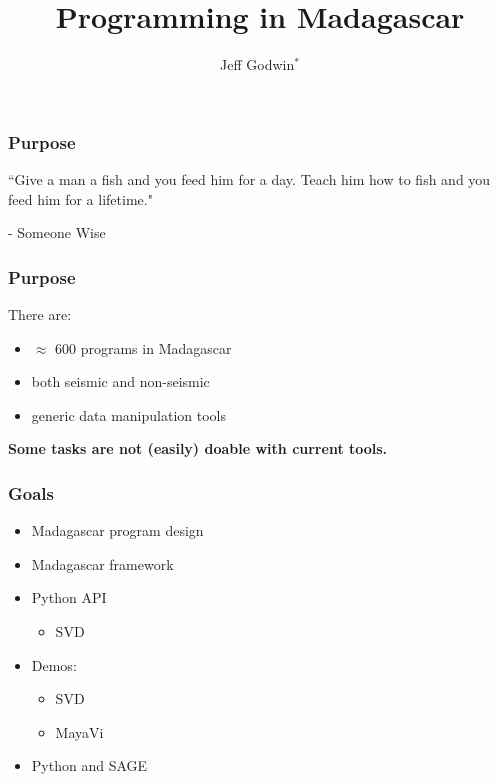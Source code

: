 
\title{Programming in Madagascar}
\author[]{Jeff Godwin$^*$}
\date{}
\large
 {\cwpcover}
\cwpnote{}

\lstset{language=Python,showstringspaces=false}

\newcommand{\centered}[1]{\begin{center} #1 \end{center}}
\begin{frame} \frametitle{Purpose}

``Give a man a fish and you feed him for a day. Teach him how to fish and you feed him for a lifetime."

 - Someone Wise
\end{frame}

\begin{frame} \frametitle{Purpose}
There are:
\begin{itemize}
\item $\approx$ 600 programs in Madagascar
\item both seismic and non-seismic
\item generic data manipulation tools
\end{itemize}
\end{frame}

\begin{frame}
\textbf{Some tasks are not (easily) doable with current tools.}
\end{frame}

\begin{frame} \frametitle{Goals}
\begin{itemize}
\item Madagascar program design
\item Madagascar framework
\item Python API
\begin{itemize}
\item SVD
\end{itemize}
\item Demos:
\begin{itemize}
\item SVD
\item MayaVi
\end{itemize}
\item Python and SAGE
\end{itemize}
\end{frame}

